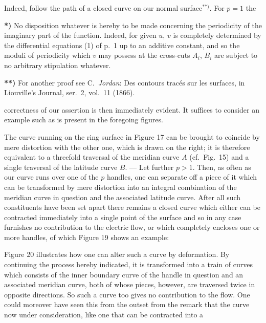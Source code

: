\documentclass{article}
\begin{document}
Indeed, follow the path of a closed curve on our normal surface${}^{**)}$. For $p = 1$ the

\textbf{*)} No disposition whatever is hereby to be made concerning the periodicity of the imaginary part of the function. Indeed, for given $u$, $v$ is completely determined by the differential equations (1) of p.~1 up to an additive constant, and so the moduli of periodicity which $v$ may possess at the cross-cuts $A_{i}$, $B_{i}$ are subject to no arbitrary stipulation whatever.

\textbf{**)} For another proof see C.\ \emph{Jordan}: Des contours tracés sur les surfaces, in Liouville's Journal, ser.~2, vol.~11 (1866).

correctness of our assertion is then immediately evident. It suffices to consider an example such as is present in the foregoing figures.

The curve running on the ring surface in Figure 17 can be brought to coincide by mere distortion with the other one, which is drawn on the right; it is therefore equivalent to a threefold traversal of the meridian curve $A$ (cf.\ Fig.~15) and a single traversal of the latitude curve $B$. --- Let further $p > 1$. Then, as often as our curve runs over one of the $p$ handles, one can separate off a piece of it which can be transformed by mere distortion into an integral combination of the meridian curve in question and the associated latitude curve. After all such constituents have been set apart there remains a closed curve which either can be contracted immediately into a single point of the surface and so in any case furnishes no contribution to the electric flow, or which completely encloses one or more handles, of which Figure 19 shows an example:


Figure 20 illustrates how one can alter such a curve by deformation. By continuing the process hereby indicated, it is transformed into a train of curves which consists of the inner boundary curve of the handle in question and an associated meridian curve, both of whose pieces, however, are traversed twice in opposite directions. So such a curve too gives no contribution to the flow. One could moreover have seen this from the outset from the remark that the curve now under consideration, like one that can be contracted into a
\end{document}
